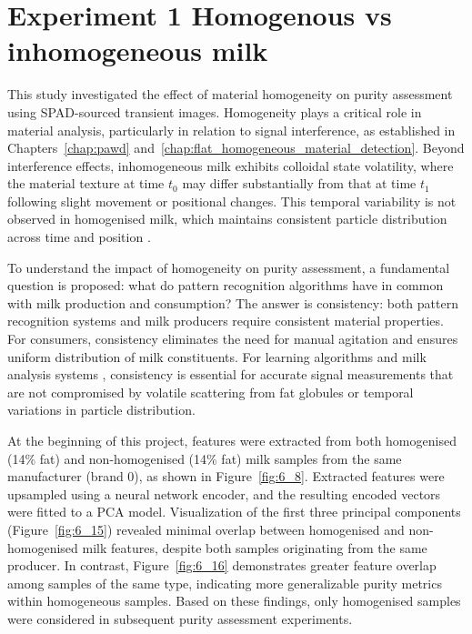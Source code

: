 \documentclass[12pt,a4paper,oneside]{report}
\let\oldsection\section
\renewcommand{\section}{\clearpage\oldsection}
\begin{document}
\section{Experiment 1 Homogenous vs inhomogeneous milk}
\label{sec:experiment_1_chapter6}

This study investigated the effect of material homogeneity on purity assessment using SPAD-sourced transient images. Homogeneity plays a critical role in material analysis, particularly in relation to signal interference, as established in Chapters~\ref{chap:pawd} and~\ref{chap:flat_homogeneous_material_detection}. Beyond interference effects, inhomogeneous milk exhibits colloidal state volatility, where the material texture at time $t_0$ may differ substantially from that at time $t_1$ following slight movement or positional changes. This temporal variability is not observed in homogenised milk, which maintains consistent particle distribution across time and position \cite{walstra1999,michalski2007,aernouts2015}.

To understand the impact of homogeneity on purity assessment, a fundamental question is proposed: what do pattern recognition algorithms have in common with milk production and consumption? The answer is consistency: both pattern recognition systems and milk producers require consistent material properties. For consumers, consistency eliminates the need for manual agitation and ensures uniform distribution of milk constituents. For learning algorithms and milk analysis systems \cite{chandra2024}, consistency is essential for accurate signal measurements that are not compromised by volatile scattering from fat globules or temporal variations in particle distribution.

At the beginning of this project, features were extracted from both homogenised (14\% fat) and non-homogenised (14\% fat) milk samples from the same manufacturer (brand 0), as shown in Figure~\ref{fig:6_8}. Extracted features were upsampled using a neural network encoder, and the resulting encoded vectors were fitted to a PCA model. Visualization of the first three principal components (Figure~\ref{fig:6_15}) revealed minimal overlap between homogenised and non-homogenised milk features, despite both samples originating from the same producer. In contrast, Figure~\ref{fig:6_16} demonstrates greater feature overlap among samples of the same type, indicating more generalizable purity metrics within homogeneous samples. Based on these findings, only homogenised samples were considered in subsequent purity assessment experiments.
\end{document}
